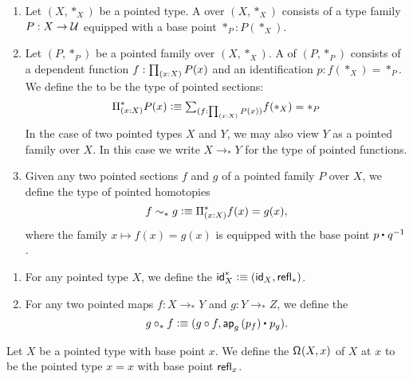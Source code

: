 \begin{defn}
\begin{enumerate}
\item Let $(X,\ast_X)$ be a pointed type. A  over $(X,\ast_X)$ consists of a type family $P:X\to \UU$ equipped with a base point $\ast_P:P(\ast_X)$. 
\item Let $(P,\ast_P)$ be a pointed family over $(X,\ast_X)$. A  of $(P,\ast_P)$ consists of a dependent function $f:\prd{x:X}P(x)$ and an identification $p:f(\ast_X)=\ast_P$. We define the  to be the type of pointed sections:
\begin{equation*}
\Pi^\ast_{(x:X)}P(x) \defeq \sm{f:\prd{x:X}P(x)}f(\ast_X)=\ast_P
\end{equation*}
In the case of two pointed types $X$ and $Y$, we may also view $Y$ as a pointed family over $X$. In this case we write $X\to_\ast Y$ for the type of pointed functions.
\item Given any two pointed sections $f$ and $g$ of a pointed family $P$ over $X$, we define the type of pointed homotopies
\begin{equation*}
f\htpy_\ast g \defeq \Pi^\ast_{(x:X)} f(x)=g(x),
\end{equation*}
where the family $x\mapsto f(x)=g(x)$ is equipped with the base point $\ct{p}{q^{-1}}$. 
\end{enumerate}
\end{defn}

\begin{defn}
\begin{enumerate}
\item For any pointed type $X$, we define the  $\idp_X\defeq (\idfunc[X],\refl{\ast})$. 
\item For any two pointed maps $f:X\to_\ast Y$ and $g:Y\to_\ast Z$, we define the 
\begin{equation*}
g\mathbin{\circ_\ast} f \defeq (g\circ f,\ct{\ap{g}{p_f}}{p_g}).
\end{equation*}
\end{enumerate}
\end{defn}

\begin{defn}
Let $X$ be a pointed type with base point $x$. We define the  $\loopspace{X,x}$ of $X$ at $x$ to be the pointed type $x=x$ with base point $\refl{x}$. 
\end{defn}


